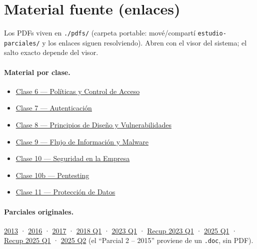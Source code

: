 \documentclass[11pt,a4paper]{article}
\begin{document}
\section*{Material fuente (enlaces)}
Los PDFs viven en \texttt{./pdfs/} (carpeta portable: mové/compartí \texttt{estudio-parciales/} y
los enlaces siguen resolviendo). Abren con el visor del sistema; el salto exacto depende del visor.

\paragraph{Material por clase.}
\begin{itemize}[leftmargin=1.4em,itemsep=1pt]
  \item \href{file:./pdfs/clase06-politicas-control-acceso.pdf}{Clase 6 — Políticas y Control de Acceso}
  \item \href{file:./pdfs/clase07-autenticacion.pdf}{Clase 7 — Autenticación}
  \item \href{file:./pdfs/clase08-principios-diseno-seguridad.pdf}{Clase 8 — Principios de Diseño y Vulnerabilidades}
  \item \href{file:./pdfs/clase09-flujo-informacion-malware.pdf}{Clase 9 — Flujo de Información y Malware}
  \item \href{file:./pdfs/clase10-seguridad-empresa.pdf}{Clase 10 — Seguridad en la Empresa}
  \item \href{file:./pdfs/clase10b-pentesting.pdf}{Clase 10b — Pentesting}
  \item \href{file:./pdfs/clase11-proteccion-datos.pdf}{Clase 11 — Protección de Datos}
\end{itemize}

\paragraph{Parciales originales.}
\href{file:./pdfs/parcial-2013.pdf}{2013} ·
\href{file:./pdfs/parcial-2016.pdf}{2016} ·
\href{file:./pdfs/parcial-2017.pdf}{2017} ·
\href{file:./pdfs/parcial-2018Q1.pdf}{2018 Q1} ·
\href{file:./pdfs/parcial-2023Q1.pdf}{2023 Q1} ·
\href{file:./pdfs/recup-2023Q1.pdf}{Recup 2023 Q1} ·
\href{file:./pdfs/parcial-2025Q1.pdf}{2025 Q1} ·
\href{file:./pdfs/recup-2025Q1.pdf}{Recup 2025 Q1} ·
\href{file:./pdfs/parcial-2025Q2.pdf}{2025 Q2}
(el ``Parcial 2 -- 2015'' proviene de un \texttt{.doc}, sin PDF).

\newpage


\clearpage

\clearpage

\clearpage

\clearpage

\clearpage

\clearpage

\clearpage

\clearpage

\clearpage

\end{document}
